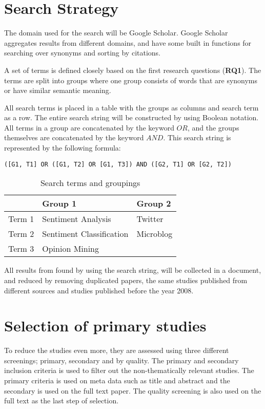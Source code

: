 \section{Search Strategy}

The domain used for the search will be Google Scholar. Google Scholar aggregates results from different domains, and have some built in functions for searching over synonyms and sorting by citations. 

A set of terms is defined closely based on the first research questions (\textbf{RQ1}). The terms are split into groups where one group consists of words that are synonyms or have similar semantic meaning.

All search terms is placed in a table with the groups as columns and search term as a row. The entire search string will be constructed by using Boolean notation. All terms in a group are concatenated by the keyword $OR$, and the groups themselves are concatenated by the keyword $AND$. This search string is represented by the following formula: 

\begin{verbatim}
([G1, T1] OR ([G1, T2] OR [G1, T3]) AND ([G2, T1] OR [G2, T2]) 
\end{verbatim}

\begin{table}[htdp]
\begin{center}
\begin{tabular}{|l|l|l|}\hline

& Group 1 & Group 2  \\\hline
Term 1 & Sentiment Analysis & Twitter \\\hline
Term 2 & Sentiment Classification & Microblog \\\hline
Term 3 & Opinion Mining &  \\\hline

\end{tabular}
\caption{Search terms and groupings}
\end{center}
\label{tab:searchterms}
\end{table}

All results from found by using the search string, will be collected in a document, and reduced by removing duplicated papers, the same studies published from different sources and studies published before the year 2008.


\section{Selection of primary studies}
To reduce the studies even more, they are assessed using three different screenings; primary, secondary and by quality. The primary and secondary inclusion criteria is used to filter out the non-thematically relevant studies. The primary criteria is used on meta data such as title and abstract and the secondary is used on the full text paper. The quality screening is also used on the full text as the last step of selection.


